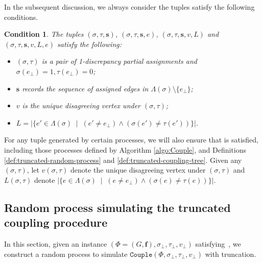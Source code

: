 \documentclass[11pt]{article}
\newtheorem{condition}{Condition}
\newcommand{\abs}[1]{\left\vert#1\right\vert}
\renewcommand{\mid}{\;\middle\vert\;} \newcommand{\cmid}{\,:\,}
\def\!#1{\mathtt{#1}}
\newcommand{\vecf}{\boldsymbol{f}}
\newcommand{\seqS}{\boldsymbol{s}}
\begin{document}
In the subsequent discussion, we always consider the tuples satisfy the following conditions.
\begin{condition}\label{condition-sigma-tau}
The tuples $(\sigma,\tau,\seqS)$, $(\sigma,\tau,\seqS,e)$,  $(\sigma,\tau,\seqS, v, L)$ and $(\sigma,\tau,\seqS, v, L,e)$ satisfy the following:
\begin{itemize}
\item $(\sigma, \tau)$ is a pair of 1-discrepancy partial assignments and $\sigma(e_\bot) = 1, \tau(e_\bot) = 0$;
\item $\seqS$ records the sequence of assigned edges in $\Lambda(\sigma)\setminus \{e_\bot\}$;
\item $v$ is the unique disagreeing vertex under $(\sigma, \tau)$;
\item $L = \abs{\{e'\in \Lambda(\sigma)\mid (e'\neq e_{\bot})\land (\sigma(e')\neq \tau(e'))\}}$.
\end{itemize}
\end{condition}
For any tuple generated by certain processes, we will also ensure that  is satisfied, including those processes defined by Algorithm \ref{algo:Couple}, and Definitions  \ref{def:truncated-random-process} and \ref{def:truncated-coupling-tree}.
Given any $(\sigma,\tau)$, let $v(\sigma,\tau)$ denote the unique disagreeing vertex under $(\sigma, \tau)$ and $L(\sigma,\tau)$ denote $\abs{\{e\in \Lambda(\sigma)\mid (e\neq e_{\bot})\land (\sigma(e)\neq \tau(e))\}}$.
    

\subsection{Random process simulating the truncated coupling procedure}

In this section, given an instance $(\Phi = (G, \vecf), \sigma_\bot, \tau_\bot, v_\bot)$ satisfying~, we construct a random process to simulate $\!{Couple}(\Phi, \sigma_\bot, \tau_\bot, v_\bot)$ with truncation.
\end{document}
